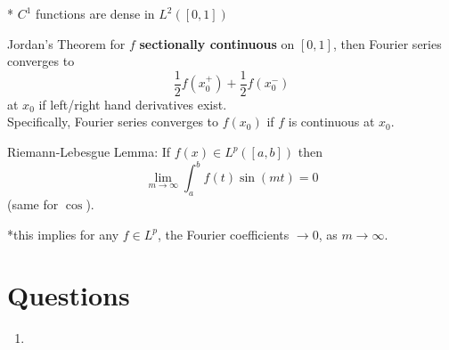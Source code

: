 \documentclass[a4paper, 12pt]{article}
\newcommand{\bt}[1]{\textbf{#1}} %
\begin{document}
\begin{multicols}{2}
* $C^1$ functions are dense in $L^2([0, 1])$


Jordan's Theorem for $f$ \bt{sectionally continuous} on $[0, 1]$, then 
Fourier series converges to 
$$\frac{1}{2}f(x_0^+) + \frac{1}{2} f(x_0^-)$$
at $x_0$ if left/right hand derivatives exist. \\
Specifically, Fourier series converges to $f(x_0)$ if $f$ is continuous 
at $x_0$.


Riemann-Lebesgue Lemma: If $f(x) \in L^p([a, b])$ then 
$$\lim_{m \rightarrow \infty} \int_a^b f(t) \sin(mt) = 0$$
(same for $\cos$).

*this implies for any $f \in L^p$, the Fourier coefficients $\rightarrow 0$, 
as $m \rightarrow \infty$.



\section{Questions}
\begin{enumerate}
    \item
\end{enumerate}



\end{multicols}
\end{document}
